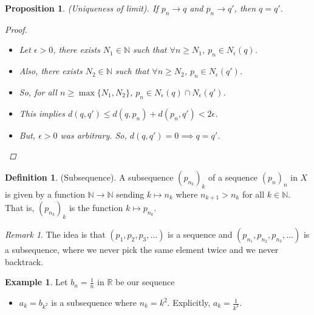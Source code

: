 \documentclass[10pt]{article}
\newcommand{\N}{\mathbb{N}}
\newcommand{\R}{\mathbb{R}}
\newtheorem{proposition}[theorem]{Proposition}
\theoremstyle{definition}
\newtheorem{definition}[theorem]{Definition}
\newtheorem{example}[theorem]{Example}
\theoremstyle{remark}
\newtheorem*{remark}{Remark}
\begin{document}
\begin{proposition}
    (Uniqueness of limit).
    If $p_n \to q$ and $p_n \to q'$, then $q = q'$.
    \begin{proof}
        \hfill
        \begin{itemize}
            \item Let $\epsilon > 0$, there exists $N_1 \in \N$ such that $\forall n \geq N_1$, $p_n \in N_\epsilon(q)$.
            \item Also, there exists $N_2 \in \N$ such that $\forall n \geq N_2$, $p_n \in N_\epsilon(q')$.
            \item So, for all $n \geq \max\{N_1, N_2\}$, $p_n \in N_\epsilon(q) \cap N_\epsilon(q')$.
            \item This implies $d(q, q') \leq d(q, p_n) + d(p_n, q') < 2\epsilon$.
            \item But, $\epsilon > 0$ was arbitrary. So, $d(q, q') = 0 \implies q = q'$.
        \end{itemize}
    \end{proof}
\end{proposition}

\begin{definition}
    (Subsequence).
    A subsequence $(p_{n_k})_k$ of a sequence $(p_n)_n$ in $X$ is given by a function
    $\N \to \N$ sending $k \mapsto n_k$ where $n_{k+1} > n_k$ for all $k \in \N$.
    That is, $(p_{n_k})_k$ is the function $k \mapsto p_{n_k}$.
\end{definition}

\begin{remark}
    The idea is that $(p_1, p_2, p_3, \ldots)$ is a sequence and $(p_{n_1}, p_{n_2}, p_{n_3}, \ldots)$ is a subsequence, where we never pick the same element twice and we never backtrack.
\end{remark}

\begin{example}
    Let $b_n = \frac{1}{n}$ in $\R$ be our sequence
    \begin{itemize}
        \item $a_k = b_{k^2}$ is a subsequence where $n_k = k^2$. Explicitly, $a_k = \frac{1}{k^2}$.
    \end{itemize}
\end{example}
\end{document}
